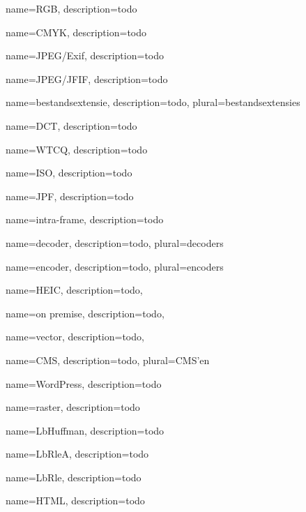 {
	name={RGB},
	description={todo}
}

{
	name={CMYK},
	description={todo}
}

{
	name={JPEG/Exif},
	description={todo}
}

{
	name={JPEG/JFIF},
	description={todo}
}

{
	name={bestandsextensie},
	description={todo},
	plural={bestandsextensies}
}

{
	name={DCT},
	description={todo}
}

{
	name={WTCQ},
	description={todo}
}

{
	name={ISO},
	description={todo}
}

{
	name={JPF},
	description={todo}
}

{
	name={intra-frame},
	description={todo}
}

{
	name={decoder},
	description={todo},
	plural={decoders}
}

{
	name={encoder},
	description={todo},
	plural={encoders}
}

{
	name={HEIC},
	description={todo},
}

{
	name={on premise},
	description={todo},
}

{
	name={vector},
	description={todo},
}

{
	name={CMS},
	description={todo},
	plural={CMS'en}
}

{
	name={WordPress},
	description={todo}
}

{
	name={raster},
	description={todo}
}

{
	name={LbHuffman},
	description={todo}
}

{
	name={LbRleA},
	description={todo}
}

{
	name={LbRle},
	description={todo}
}

{
	name={HTML},
	description={todo}
}

